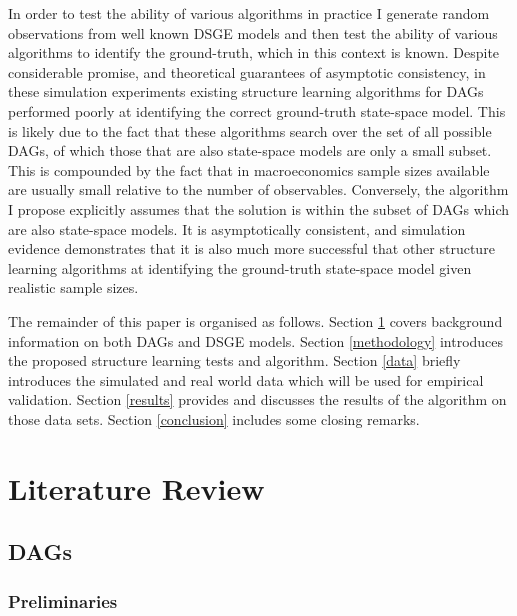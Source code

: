 \documentclass{article}
\begin{document}
In order to test the ability of various algorithms in practice I generate random observations from well known DSGE models and then test the ability of various algorithms to identify the ground-truth, which in this context is known. Despite considerable promise, and theoretical guarantees of asymptotic consistency, in these simulation experiments existing structure learning algorithms for DAGs performed poorly at identifying the correct ground-truth state-space model. This is likely due to the fact that these algorithms search over the set of all possible DAGs, of which those that are also state-space models are only a small subset. This is compounded by the fact that in macroeconomics sample sizes available are usually small relative to the number of observables. Conversely, the algorithm I propose explicitly assumes that the solution is within the subset of DAGs which are also state-space models. It is asymptotically consistent, and simulation evidence demonstrates that it is also much more successful that other structure learning algorithms at identifying the ground-truth state-space model given realistic sample sizes.

The remainder of this paper is organised as follows. Section \ref{lit_review} covers background information on both DAGs and DSGE models. Section \ref{methodology} introduces the proposed structure learning tests and algorithm. Section \ref{data} briefly introduces the simulated and real world data which will be used for empirical validation. Section \ref{results} provides and discusses the results of the algorithm on those data sets. Section \ref{conclusion} includes some closing remarks.

\section{Literature Review} \label{lit_review}

\subsection{DAGs} \label{dags}

\subsubsection{Preliminaries} \label{prelim}
\end{document}
